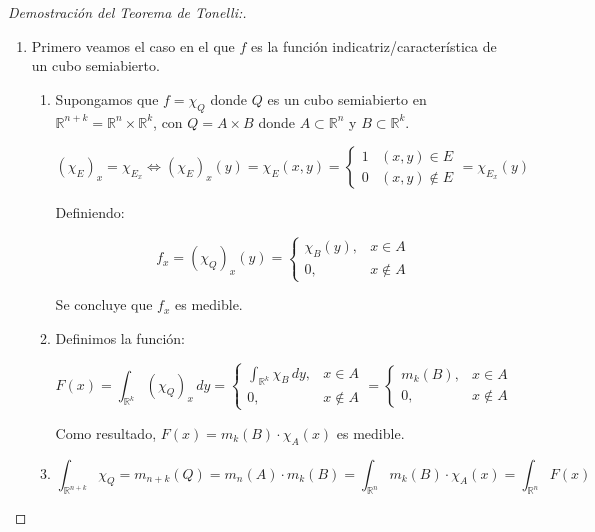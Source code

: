 \begin{proof}[Demostración del Teorema de Tonelli:]
\leavevmode
\begin{enumerate}
\item Primero veamos el caso en el que \( f \) es la función
indicatriz/característica de un cubo semiabierto.
\begin{enumerate}
\item Supongamos que \( f = \chi_Q \) donde \( Q \) es un cubo semiabierto en \(
\mathbb{R}^{n+k} = \mathbb{R}^n \times \mathbb{R}^k \), con \( Q = A \times B
\) donde \( A \subset \mathbb{R}^n \) y \( B \subset \mathbb{R}^k \).

\begin{observación}
$(\chi_E)_x = \chi_{E_x}  \iff (\chi_E)_x(y) = \chi_E(x, y) = \begin{cases} 1 & (x, y) \in E \\ 0 & (x, y) \notin E \end{cases} = \chi_{E_x}(y)$
\end{observación}

Definiendo:

$$
    f_x = (\chi_Q)_x(y) = \begin{cases}
        \chi_B(y), & x \in A    \\
        0,         & x \notin A
    \end{cases}
$$

Se concluye que \( f_x \) es medible.

\item Definimos la función:

$$
    F(x) = \int_{\mathbb{R}^k} (\chi_Q)_x \, dy = \begin{cases}
        \int_{\mathbb{R}^k} \chi_B \, dy, & x \in A    \\
        0,                                & x \notin A
    \end{cases} =
    \begin{cases}
        m_k(B), & x \in A    \\
        0,      & x \notin A
    \end{cases}
$$

Como resultado, \( F(x) = m_k(B) \cdot \chi_A(x) \) es medible.

\item $$\int_{\mathbb{R}^{n+k}}\chi_Q = m_{n+k}(Q) = m_n(A) \cdot m_k(B) = \int_{\mathbb{R}^n}m_k(B) \cdot \chi_A(x) = \int_{\mathbb{R}^n}F(x)$$

\end{enumerate}


\end{enumerate}
\end{proof}
